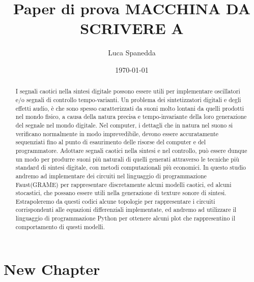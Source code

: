 \documentclass[ms,a4paper]{memoir}
\begin{document}
\title{Paper di prova MACCHINA DA SCRIVERE A}
\author{Luca Spanedda}
\date{\today}
\maketitle

\begin{abstract}
I segnali caotici nella sintesi digitale possono essere utili per implementare  
oscillatori e/o segnali di controllo tempo-varianti.
Un problema dei sintetizzatori digitali e degli effetti audio,
è che sono spesso caratterizzati da suoni molto lontani da quelli prodotti nel mondo fisico,
a causa della natura precisa e tempo-invariante della loro generazione del segnale nel mondo digitale.
\newline
Nel computer, i dettagli che in natura nel suono si verificano normalmente in modo imprevedibile, 
devono essere accuratamente sequenziati fino al punto di esaurimento 
delle risorse del computer e del programmatore.
\newline
Adottare segnali caotici nella sintesi e nel controllo, può essere dunque un modo
per produrre suoni più naturali di quelli generati attraverso le tecniche più standard di sintesi digitale,
con metodi computazionali più economici.
\newline
In questo studio andremo ad implementare dei circuiti nel linguaggio di programmazione Faust(GRAME)
per rappresentare discretamente alcuni modelli caotici, ed alcuni stocastici,
che possano essere utili nella generazione di texture sonore di sintesi.
Estrapoleremo da questi codici alcune topologie per rappresentare i circuiti corrispondenti
alle equazioni differenziali implementate, ed andremo ad utilizzare il linguaggio di programmazione 
Python per ottenere alcuni plot che rappresentino il comportamento di questi modelli.
\end{abstract}


\twocolumn

\chapter{New Chapter}
\end{document}
